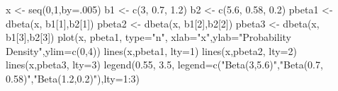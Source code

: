 \begin{Schunk}
\begin{Sinput}
 x <- seq(0,1,by=.005)
 b1 <- c(3, 0.7, 1.2)
 b2 <- c(5.6, 0.58, 0.2)
 pbeta1 <- dbeta(x, b1[1],b2[1])
 pbeta2 <- dbeta(x, b1[2],b2[2])
 pbeta3 <- dbeta(x, b1[3],b2[3])
 plot(x, pbeta1, type="n", xlab="x",ylab="Probability Density",ylim=c(0,4))
 lines(x,pbeta1, lty=1)
 lines(x,pbeta2, lty=2)
 lines(x,pbeta3, lty=3)
 legend(0.55, 3.5, legend=c("Beta(3,5.6)","Beta(0.7, 0.58)","Beta(1.2,0.2)"),lty=1:3)
\end{Sinput}
\end{Schunk}
